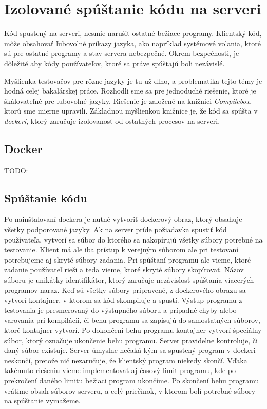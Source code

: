 \section{Izolované spúštanie kódu na serveri}
Kód spustený na serveri, nesmie narušiť ostatné bežiace programy. Klientský kód, môže obsahovať
ľubovolné príkazy jazyka, ako napríklad systémové volania, ktoré sú pre ostatné programy a stav
servera nebezpečné. Okrem bezpečnosti, je dôležité aby kódy používateľov, ktoré sa práve spúštajú
boli nezávislé.

Myšlienka testovačov pre rôzne jazyky je tu už dlho, a problematika tejto témy je hodná celej
bakalárskej práce. Rozhodli sme sa pre jednoduché riešenie, ktoré je škálovateľné pre ľubovolné
jazyky. Riešenie je založené na knižnici \textit{Compilebox}, ktorú sme mierne upravili. Základnou
myšlienkou knižnice je, že kód sa spúšta v \textit{dockeri}, ktorý zaručuje izolovanosť od ostatných
procesov na serveri. 

\subsection{Docker}
TODO:

\subsection{Spúštanie kódu}
Po nainštalovaní dockera je nutné vytvoriť dockerový obraz, ktorý obsahuje všetky podporované
jazyky. Ak na server príde požiadavka spustiť kód používateľa, vytvorí sa súbor do ktorého sa
nakopírujú všetky súbory potrebné na testovanie. Klient má ale iba prístup k verejným súborom ale
pri testovaní potrebujeme aj skryté súbory zadania. Pri spúštaní programu ale vieme, ktoré zadanie
používateľ rieši a teda vieme, ktoré skryté súbory skopírovať. Názov súboru je unikátky
identifikátor, ktorý zaručuje nezávislosť spúštania viacerých programov naraz. Keď sú všetky súbory
pripravené, z dockerového obrazu sa vytvorí kontajner, v ktorom sa kód skompiluje a spustí. Výstup
programu z testovania je presmerovaný do výstupného súboru a prípadné chyby alebo varovania pri
kompilácii, či behu programu sa zapisujú do samostatných súborov, ktoré kontajner vytvorí. Po
dokončení behu programu kontajner vytvorí špeciálny súbor, ktorý označuje ukončenie behu programu.
Server pravidelne kontroluje, či daný súbor existuje. Server úmyslne nečaká kým sa spustený program
v dockeri neskončí, pretože nič nezaručuje, že klientský program niekedy skončí. Vďaka takémuto
riešeniu vieme implementovať aj časový limit programu, kde po prekročení daného limitu bežiaci
program ukončíme. Po skončení behu programu vrátime obsah súborov serveru, a celý priečinok, v
ktorom boli potrebné súbory na spúštanie vymažeme.
